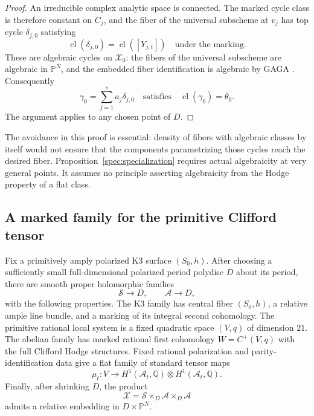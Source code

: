 \begin{proof}
An irreducible complex analytic space is connected.  The marked cycle
class is therefore constant on $C_j$, and the fiber of the universal
subscheme at $v_j$ has top cycle $\delta_{j,0}$ satisfying
\[
 \operatorname{cl}(\delta_{j,0})
 =\operatorname{cl}([Y_{j,t}])
 \quad\text{under the marking.}
\]
These are algebraic cycles on $\mathcal X_0$: the fibers of the
universal subscheme are algebraic in $\mathbb P^N$, and the embedded
fiber identification is algebraic by GAGA \cite{SerreGAGA}.
Consequently
\[
 \gamma_0=\sum_{j=1}^{s}a_j\delta_{j,0}
 \quad\text{satisfies}\quad
 \operatorname{cl}(\gamma_0)=\theta_0.
\]
The argument applies to any chosen point of $D$.
\end{proof}

The avoidance in this proof is essential: density of fibers with
algebraic classes by itself would not ensure that the components
parametrizing those cycles reach the desired fiber.  Proposition~\ref{spec:specialization}
requires actual algebraicity at very general points.  It assumes no
principle asserting algebraicity from the Hodge property of a flat
class.

\subsection{A marked family for the primitive Clifford tensor}

\begin{lemma}
\label{spec:local}
Fix a primitively amply polarized K3 surface $(S_0,h)$.
After choosing a sufficiently small full-dimensional polarized period
polydisc $D$ about its period, there are smooth proper holomorphic
families
\[
 \mathcal S\longrightarrow D,
 \qquad \mathcal A\longrightarrow D,
\]
with the following properties.
The K3 family has central fiber $(S_0,h)$, a relative ample line bundle,
and a marking of its integral second cohomology.
The primitive rational local system is a fixed quadratic space
$(V,q)$ of dimension $21$.
The abelian family has marked rational first cohomology
$W=C^+(V,q)$ with the full Clifford Hodge structures.
Fixed rational polarization and parity-identification data give a flat
family of standard tensor maps
\[
 \mu_t:V\longrightarrow H^1(\mathcal A_t,\mathbb Q)
                       \otimes H^1(\mathcal A_t,\mathbb Q).
\]
Finally, after shrinking $D$, the product
\[
 \mathcal X=\mathcal S\times_D\mathcal A\times_D\mathcal A
\]
admits a relative embedding in $D\times\mathbb P^N$.
\end{lemma}

